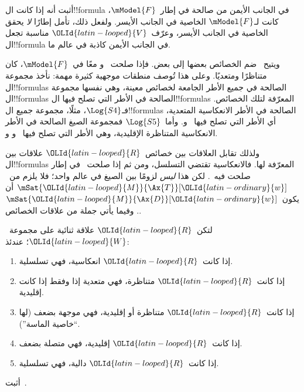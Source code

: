 \documentclass[../../../include/open-logic-section]{subfiles}
\begin{document}
\begin{prob}
أثبت أنه إذا كانت ال!!{formula} في الجانب الأيمن من
 صالحة في إطار~$\mModel{F}$،
كانت لـ$\mModel{F}$ الخاصية في الجانب الأيسر. ولفعل ذلك، تأمل إطارًا
\emph{لا} يحقق الخاصية في الجانب الأيسر، وعرّف~$\OLId{latin-looped}{V}$ مناسبة تجعل
ال!!{formula} في الجانب الأيمن كاذبة في عالم ما.
\end{prob}

ويتيح~ ضم الخصائص بعضها إلى بعض.
فإذا صلحت~ و معًا في~$\mModel{F}$، كان متناظرًا
ومتعديًا. وعلى هذا تُوصف منطقات موجهية كثيرة مهمة:
نأخذ مجموعة ال!!{formula}s الصالحة في جميع الأطر الجامعة
لخصائص معينة، وهي نفسها مجموعة ال!!{formula}s الصالحة في
الأطر التي تصلح فيها ال!!{formula}s المعرّفة لتلك الخصائص.
فـ$\Log{S4}$، مثلًا، مجموعة جميع ال!!{formula}s الصالحة في
الأطر الانعكاسية المتعدية، أي الأطر التي تصلح فيها~ و.
وأما~$\Log{S5}$ فمجموعة الصيغ الصالحة في الأطر الانعكاسية
المتناظرة الإقليدية، وهي الأطر التي تصلح فيها~ و و.

ولذلك تقابل العلاقات بين خصائص~$\OLId{latin-looped}{R}$ علاقات بين ال!!{formula}s
المعرّفة لها. فالانعكاسية تقتضي التسلسل، ومن ثم إذا صلحت~
في إطار صلحت فيه~. لكن هذا \emph{ليس} لزومًا بين الصيغ
في عالم واحد؛ فلا يلزم من~$\mSat{\OLId{latin-looped}{M}}{\Ax{T}}[\OLId{latin-ordinary}{w}]$
أن يكون~$\mSat{\OLId{latin-looped}{M}}{\Ax{D}}[\OLId{latin-ordinary}{w}]$. وفيما يأتي جملة من علاقات الخصائص.

\begin{prop}
  لتكن~$\OLId{latin-looped}{R}$ علاقة ثنائية على مجموعة~$\OLId{latin-looped}{W}$؛ عندئذ:
  \begin{enumerate}
  \item إذا كانت~$\OLId{latin-looped}{R}$ انعكاسية، فهي تسلسلية.
  \item إذا كانت~$\OLId{latin-looped}{R}$ متناظرة، فهي متعدية إذا وفقط إذا كانت إقليدية.
  \item إذا كانت~$\OLId{latin-looped}{R}$ متناظرة أو إقليدية، فهي موجهة بضعف (لها ``خاصية
    الماسة'').
  \item إذا كانت~$\OLId{latin-looped}{R}$ إقليدية، فهي متصلة بضعف.
  \item إذا كانت~$\OLId{latin-looped}{R}$ دالية، فهي تسلسلية.
  \end{enumerate}
\end{prop}

\begin{prob}
  أثبت~.
\end{prob}
\end{document}
